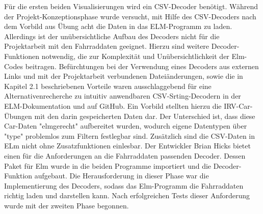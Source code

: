 \documentclass[usegeometry=true]{scrartcl}
\begin{document}
Für die ersten beiden Visualisierungen wird ein CSV-Decoder benötigt. Während der Projekt-Konzeptionsphase wurde versucht, mit Hilfe des CSV-Decoders nach dem Vorbild aus Übung acht die Daten in das ELM-Programm zu laden. Allerdings ist der unübersichtliche Aufbau des Decoders nicht für die Projektarbeit mit den Fahrraddaten geeignet. Hierzu sind weitere Decoder-Funktionen notwendig, die zur Komplexität und Unübersichtlichkeit der Elm-Codes beitragen.
Befürchtungen bei der Verwendung eines Decoders aus externen Links und mit der Projektarbeit verbundenen Dateiänderungen, sowie die in Kapitel 2.1 beschriebenen Vorteile waren ausschlaggebend für eine Alternativenrecherche zu intuitiv anwendbaren CSV-Srting-Decodern in der ELM-Dokumentation und auf GitHub.
Ein Vorbild stellten hierzu die IRV-Car-Übungen mit den darin gespeicherten Daten dar. Der Unterschied ist, dass diese Car-Daten "elmgerecht" aufbereitet wurden, wodurch eigene Datentypen über "type" problemlos zum Filtern festlegbar sind. Zusätzlich sind die CSV-Daten in ELm nicht ohne Zusatzfunktionen einlesbar. Der Entwickler Brian Hicks bietet einen für die Anforderungen an die Fahrraddaten passenden Decoder. Dessen Paket für Elm wurde in die beiden Programme importiert und die Decoder-Funktion aufgebaut. 
Die Herausforderung in dieser Phase war die Implementierung des Decoders, sodass das Elm-Programm die Fahrraddaten richtig laden und darstellen kann. Nach erfolgreichen Tests dieser Anforderung wurde mit der zweiten Phase begonnen.
\end{document}
